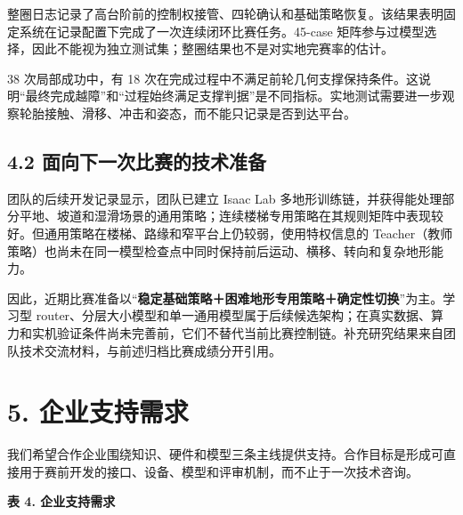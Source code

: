 \documentclass[
  11pt,
  a4paper,
]{article}
\begin{document}
整圈日志记录了高台阶前的控制权接管、四轮确认和基础策略恢复。该结果表明固定系统在记录配置下完成了一次连续闭环比赛任务。45-case
矩阵参与过模型选择，因此不能视为独立测试集；整圈结果也不是对实地完赛率的估计。

38 次局部成功中，有 18
次在完成过程中不满足前轮几何支撑保持条件。这说明``最终完成越障''和``过程始终满足支撑判据''是不同指标。实地测试需要进一步观察轮胎接触、滑移、冲击和姿态，而不能只记录是否到达平台。

\subsection{4.2
面向下一次比赛的技术准备}\label{ux9762ux5411ux4e0bux4e00ux6b21ux6bd4ux8d5bux7684ux6280ux672fux51c6ux5907}

团队的后续开发记录显示，团队已建立 Isaac Lab
多地形训练链，并获得能处理部分平地、坡道和湿滑场景的通用策略；连续楼梯专用策略在其规则矩阵中表现较好。但通用策略在楼梯、路缘和窄平台上仍较弱，使用特权信息的
Teacher（教师策略）也尚未在同一模型检查点中同时保持前后运动、横移、转向和复杂地形能力。

因此，近期比赛准备以``\textbf{稳定基础策略＋困难地形专用策略＋确定性切换}''为主。学习型
router、分层大小模型和单一通用模型属于后续候选架构；在真实数据、算力和实机验证条件尚未完善前，它们不替代当前比赛控制链。补充研究结果来自团队技术交流材料，与前述归档比赛成绩分开引用。

\clearpage

\section{5. 企业支持需求}\label{ux4f01ux4e1aux652fux6301ux9700ux6c42}

我们希望合作企业围绕知识、硬件和模型三条主线提供支持。合作目标是形成可直接用于赛前开发的接口、设备、模型和评审机制，而不止于一次技术咨询。

{\small\sffamily\bfseries\color{ReportGray}表 4. 企业支持需求\par}
\end{document}

